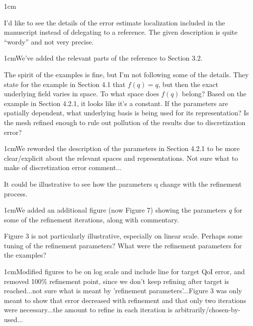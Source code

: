 \documentclass[12pt, letterpaper]{article}
\newcommand{\answer}[1]{\begin{adjustwidth}{1cm}{}{\color{blue}#1}\end{adjustwidth}}
\newcommand{\red}[1]{{\color{red}#1}}
\newcommand{\notdone}{{\color{red}{Changes not yet made.}}}
\begin{document}
\answer{}
\notdone

I'd like to see the details of the error estimate localization included in the manuscript instead
of delegating to a reference. The given description is quite “wordy” and not very precise.

\answer{We've added the relevant parts of the reference to Section 3.2.}

The spirit of the examples is fine, but I'm not following some of the details. They state for
the example in Section 4.1 that $f (q) = q$, but then the exact underlying field varies in space.
To what space does $f (q)$ belong? Based on the example in Section 4.2.1, it looks like it's
a constant. If the parameters are spatially dependent, what underlying basis is being used
for its representation? Is the mesh refined enough to rule out pollution of the results due to
discretization error?

\answer{We reworded the description of the parameters in Section 4.2.1 to be more clear/explicit about the relevant spaces and representations. \red{Not sure what to make of discretization error comment...}}
\notdone

It could be illustrative to see how the parameters q change with the refinement process.

\answer{We added an additional figure (now Figure 7) showing the parameters $q$ for some of the refinement iterations, along with commentary.}

Figure 3 is not particularly illustrative, especially on linear scale. Perhaps some tuning of the
refinement parameters? What were the refinement parameters for the examples?

\answer{Modified figures to be on log scale and include line for target QoI error, and removed 100\% refinement point, since we don't keep refining after target is reached...not sure what is meant by 'refinement parameters'...Figure 3 was only meant to show that error decreased with refinement and that only two iterations were necessary...the amount to refine in each iteration is arbitrarily/chosen-by-used...}
\notdone
\end{document}
